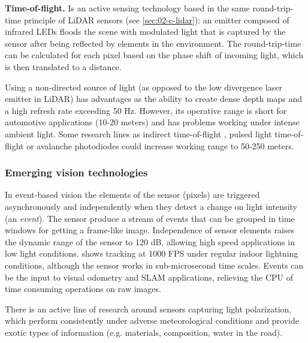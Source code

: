 \documentclass[journal]{IEEEtran}
\begin{document}
\textbf{Time-of-flight.} Is an active sensing technology 
\cite{Hansard2013} based in the same round-trip-time principle 
of LiDAR sensors (see \ref{sec:02-c-lidar}): an emitter composed of infrared 
LEDs floods the scene with modulated light that is captured by the sensor after
being reflected by elements in the environment. 
The round-trip-time can be calculated for each pixel based on the phase shift 
of incoming light, which is then translated to a distance.

Using a non-directed source of light (as opposed to the low divergence laser
emitter in LiDAR) has advantages as the ability to create dense depth maps and
a high refresh rate exceeding 50 Hz. However, its operative range is short for
automotive applications (10-20 meters) and has problems working under intense
ambient light. 
Some research lines as indirect time-of-flight \cite{Villa2017}, pulsed light
time-of-flight or avalanche photodiodes \cite{Panasonic2018} could increase
working range to 50-250 meters.



\subsubsection{Emerging vision technologies}

In event-based vision the elements of the sensor (pixels) are triggered 
asynchronously and independently when they detect a change on light intensity 
(an \emph{event}).
The sensor produce a stream of events that can be grouped in time windows for
getting a frame-like image. 
Independence of sensor elements raises the dynamic range of the sensor to 
120 dB, allowing high speed applications in low light conditions. 
\cite{Mueggler2014} shows tracking at 1000 FPS under regular indoor lightning 
conditions, although the sensor works in sub-microsecond time scales.
Events can be the input to visual odometry \cite{Censi2014} and SLAM
\cite{Vidal2017} applications, relieving the CPU of time consuming operations
on raw images. 

There is an active line of research \cite{Garcia2018} around sensors 
capturing light polarization, which perform consistently under adverse
meteorological conditions and provide exotic types of information (e.g.
materials, composition, water in the road).
\end{document}
